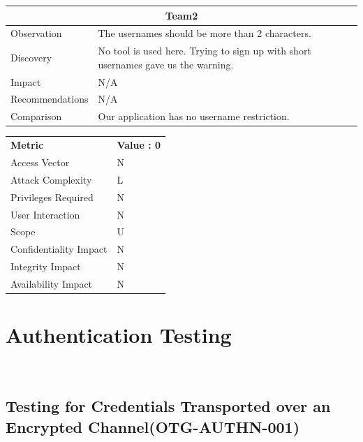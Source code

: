 \documentclass[headsepline,footsepline,footinclude=false,oneside,fontsize=11pt,paper=a4,listof=totoc,bibliography=totoc]{scrbook} %
\begin{document}
\begin{tabular}{ l|p{11cm}  }
	\hline
	\multicolumn{2}{c}{\textbf{Team2}} \\
	\hline
	Observation   & The usernames should be more than 2 characters. \\
	Discovery  & No tool is used here. Trying to sign up with short usernames gave us the warning. \\
	Impact   & N/A \\
	Recommendations & N/A \\
	Comparison & Our application has no username restriction. \\
	\hline
\end{tabular}
\begin{center}
	\begin{tabular}{ll}
		\rowcolor[HTML]{34CDF9}
		{\color[HTML]{ECF4FF} \textbf{Metric}}        & {\color[HTML]{ECF4FF} \textbf{Value : 0}} \\
		\rowcolor[HTML]{BBDAFF}
		{\color[HTML]{333333} Access Vector}          & {\color[HTML]{333333} } N              \\
		\rowcolor[HTML]{ECF4FF}
		{\color[HTML]{333333} Attack Complexity}      & {\color[HTML]{333333} } L              \\
		\rowcolor[HTML]{BBDAFF}
		{\color[HTML]{333333} Privileges Required}    & {\color[HTML]{333333} } N              \\
		\rowcolor[HTML]{ECF4FF}
		{\color[HTML]{333333} User Interaction}       & {\color[HTML]{333333} } N              \\
		\rowcolor[HTML]{BBDAFF}
		{\color[HTML]{333333} Scope}                  & {\color[HTML]{333333} } U              \\
		\rowcolor[HTML]{ECF4FF}
		{\color[HTML]{333333} Confidentiality Impact} & {\color[HTML]{333333} } N              \\
		\rowcolor[HTML]{BBDAFF}
		{\color[HTML]{333333} Integrity Impact}       & {\color[HTML]{333333} } N              \\
		\rowcolor[HTML]{ECF4FF}
		{\color[HTML]{333333} Availability Impact}    & {\color[HTML]{333333} } N
	\end{tabular}
\end{center}
\pagebreak

\section{Authentication Testing}\
\subsection{Testing for Credentials Transported over an Encrypted Channel(OTG-AUTHN-001)}\
\end{document}
